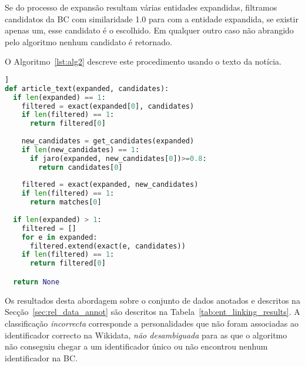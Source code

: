 \documentclass[a4paper, twocolumn, 11pt, twoside]{article}
\begin{document}
Se do processo de expansão resultam várias entidades expandidas, filtramos candidatos da BC com similaridade 1.0 para com a entidade expandida, se existir apenas um, esse candidato é o escolhido. Em qualquer outro caso não abrangido pelo algoritmo nenhum candidato é retornado. 

O Algoritmo~\ref{lst:alg2} descreve este procedimento usando o texto da notícia.

\begin{lstlisting}[language=python,columns=fullflexible,frame=single,label={lst:alg2},title={Algoritmo 2. Ligação com a Wikidata usando o texto da notícia para expandir as entidades reconhecidas no título.},captionpos=b]]
def article_text(expanded, candidates):
  if len(expanded) == 1:
    filtered = exact(expanded[0], candidates)
	if len(filtered) == 1:
	  return filtered[0]
	  
    new_candidates = get_candidates(expanded)
    if len(new_candidates) == 1:
      if jaro(expanded, new_candidates[0])>=0.8:
	    return candidates[0]
 
    filtered = exact(expanded, new_candidates)
    if len(filtered) == 1:
      return matches[0]
  
  if len(expanded) > 1:
    filtered = []
    for e in expanded:
      filtered.extend(exact(e, candidates))
    if len(filtered) == 1:
      return filtered[0]

  return None
\end{lstlisting}


\begin{comment}

\begin{lstlisting}[language=python,columns=fullflexible,label={lst:alg3},caption=News text approach.]]

def entity_linking(per):
    candidates = get_candidates(ent)
    wiki_id = title_only(per, candidates)
    if not wiki_id:
        expanded = expand(per, news_text)
        wiki_id = article_text(candidates, expanded)
    return wiki_id
\end{lstlisting}

\end{comment}


Os resultados desta abordagem sobre o conjunto de dados anotados e descritos na Secção~\ref{sec:rel_data_annot} são descritos na Tabela~\ref{tab:ent_linking_results}. A classificação \textit{incorrecta} corresponde a personalidades que não foram associadas ao identificador correcto na Wikidata, \textit{não desambiguada} para as que o algoritmo não conseguiu chegar a um identificador único ou não encontrou nenhum identificador na BC.
\end{document}
